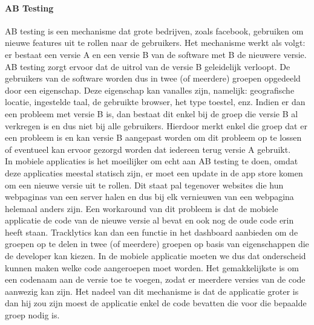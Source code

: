 \paragraph{AB Testing}
AB testing is een mechanisme dat grote bedrijven, zoals facebook, gebruiken om nieuwe features uit te rollen naar de gebruikers. Het mechanisme werkt als volgt: er bestaat een versie A en een versie B van de software met B de nieuwere versie. AB testing zorgt ervoor dat de uitrol van de versie B geleidelijk verloopt. De gebruikers van de software worden dus in twee (of meerdere) groepen opgedeeld door een eigenschap. Deze eigenschap kan vanalles zijn, namelijk: geografische locatie, ingestelde taal, de gebruikte browser, het type toestel, enz. Indien er dan een probleem met versie B is, dan bestaat dit enkel bij de groep die versie B al verkregen is en dus niet bij alle gebruikers. Hierdoor merkt enkel die groep dat er een probleem is en kan versie B aangepast worden om dit probleem op te lossen of eventueel kan ervoor gezorgd worden dat iedereen terug versie A gebruikt. \\

In mobiele applicaties is het moeilijker om echt aan AB testing te doen, omdat deze applicaties meestal statisch zijn, er moet een update in de app store komen om een nieuwe versie uit te rollen. Dit staat pal tegenover websites die hun webpaginas van een server halen en dus bij elk vernieuwen van een webpagina helemaal anders zijn. 
Een workaround van dit probleem is dat de mobiele applicatie de code van de nieuwe versie al bevat en ook nog de oude code erin heeft staan. Tracklytics kan dan een functie in het dashboard aanbieden om de groepen op te delen in twee (of meerdere) groepen op basis van eigenschappen die de developer kan kiezen. In de mobiele applicatie moeten we dus dat onderscheid kunnen maken welke code aangeroepen moet worden. Het gemakkelijkste is om een codenaam aan de versie toe te voegen, zodat er meerdere versies van de code aanwezig kan zijn. 
Het nadeel van dit mechanisme is dat de applicatie groter is dan hij zou zijn moest de applicatie enkel de code bevatten die voor die bepaalde groep nodig is.


